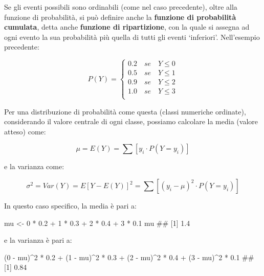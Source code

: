 \documentclass[a4paper,12pt,oneside]{book}
\newenvironment{Shaded}{\begin{snugshade}}{\end{snugshade}}
\newcommand{\DecValTok}[1]{#1}
\newcommand{\FloatTok}[1]{#1}
\newcommand{\SpecialCharTok}[1]{#1}
\newcommand{\DocumentationTok}[1]{#1}
\newcommand{\OtherTok}[1]{#1}
\newcommand{\NormalTok}[1]{#1}
\begin{document}
Se gli eventi possibili sono ordinabili (come nel caso precedente), oltre alla funzione di probabilità, si può definire anche la \textbf{funzione di probabilità cumulata}, detta anche \textbf{funzione di ripartizione}, con la quale si assegna ad ogni evento la sua probabilità più quella di tutti gli eventi `inferiori'. Nell'esempio precedente:

\[
P(Y) = \left\{ \begin{array}{l}
 0.2\,\,\,\,\,\,se\,\,\,\,\,\,Y \leq 0 \\ 
 0.5\,\,\,\,\,\,se\,\,\,\,\,\,Y \leq 1 \\ 
 0.9\,\,\,\,\,\,se\,\,\,\,\,\,Y \leq 2 \\ 
 1.0\,\,\,\,\,\,se\,\,\,\,\,\,Y \leq 3 \\ 
 \end{array} \right.
\]

Per una distribuzione di probabilità come questa (classi numeriche ordinate), considerando il valore centrale di ogni classe, possiamo calcolare la media (valore atteso) come:

\[
\mu  = E(Y) = \sum{\left[ y_i \cdot P(Y = y_i ) \right]}
\]

e la varianza come:

\[\sigma ^2  = Var(Y) = E\left[ {Y - E(Y)} \right]^2  = \sum{ \left[ {\left( {y_i  - \mu } \right)^2 \cdot P(Y = y_i )} \right]}\]

In questo caso specifico, la media è pari a:

\begin{Shaded}
\begin{Highlighting}[]
\NormalTok{mu }\OtherTok{\textless{}{-}} \DecValTok{0} \SpecialCharTok{*} \FloatTok{0.2} \SpecialCharTok{+} \DecValTok{1} \SpecialCharTok{*} \FloatTok{0.3} \SpecialCharTok{+} \DecValTok{2} \SpecialCharTok{*} \FloatTok{0.4} \SpecialCharTok{+} \DecValTok{3} \SpecialCharTok{*} \FloatTok{0.1}
\NormalTok{mu}
\DocumentationTok{\#\# [1] 1.4}
\end{Highlighting}
\end{Shaded}

e la varianza è pari a:

\begin{Shaded}
\begin{Highlighting}[]
\NormalTok{(}\DecValTok{0} \SpecialCharTok{{-}}\NormalTok{ mu)}\SpecialCharTok{\^{}}\DecValTok{2} \SpecialCharTok{*} \FloatTok{0.2} \SpecialCharTok{+}\NormalTok{ (}\DecValTok{1} \SpecialCharTok{{-}}\NormalTok{ mu)}\SpecialCharTok{\^{}}\DecValTok{2} \SpecialCharTok{*} \FloatTok{0.3} \SpecialCharTok{+}\NormalTok{ (}\DecValTok{2} \SpecialCharTok{{-}}\NormalTok{ mu)}\SpecialCharTok{\^{}}\DecValTok{2} \SpecialCharTok{*} \FloatTok{0.4} \SpecialCharTok{+}
\NormalTok{  (}\DecValTok{3} \SpecialCharTok{{-}}\NormalTok{ mu)}\SpecialCharTok{\^{}}\DecValTok{2} \SpecialCharTok{*} \FloatTok{0.1}
\DocumentationTok{\#\# [1] 0.84}
\end{Highlighting}
\end{Shaded}
\end{document}
